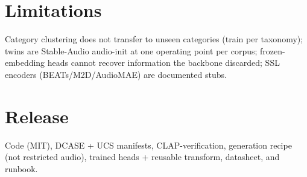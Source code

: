 \documentclass[11pt]{article}
\begin{document}
\section{Limitations}
Category clustering does not transfer to unseen categories (train per taxonomy); twins are
Stable-Audio audio-init at one operating point per corpus; frozen-embedding heads cannot recover
information the backbone discarded; SSL encoders (BEATs/M2D/AudioMAE) are documented stubs.

\section{Release}
Code (MIT), DCASE + UCS manifests, CLAP-verification, generation recipe (not restricted audio),
trained heads + reusable transform, datasheet, and runbook.
\end{document}
